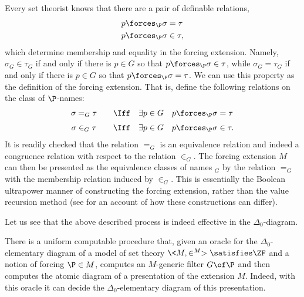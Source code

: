 \documentclass{amsart}
\begin{document}
 Every set theorist knows that there are a pair of definable relations,
 \begin{align*}
 p &\forces_\P \sigma = \tau \\
 p &\forces_\P \sigma \in \tau,
 \end{align*}
 which determine membership and equality in the forcing extension. Namely, $\sigma_G \in \tau_G$ if and only if there is $p \in G$ so that $p \forces_\P \sigma \in \tau$, while $\sigma_G = \tau_G$ if and only if there is $p \in G$ so that $p \forces_\P \sigma = \tau$.
 We can use this property as the definition of the forcing extension. That is, define the following relations on the class of $\P$-names:
   $$\begin{array}{cl}
       \sigma =_G \tau\quad &\Iff \quad \exists p\in G\quad p\forces_\P \sigma=\tau \medskip\\
       \sigma \in_G \tau\quad &\Iff \quad \exists p\in G\quad p\forces_\P \sigma\in\tau.\\
   \end{array}
   $$
 It is readily checked that the relation $=_G$ is an equivalence relation and indeed a congruence relation with respect to the relation $\in_G$. The forcing extension $M$ can then be presented as the equivalence classes of names $_G$ by the relation $=_G$ with the membership relation induced by $\in_G$. This is essentially the Boolean ultrapower manner of constructing the forcing extension, rather than the value recursion method (see \cite{HamkinsSeabold:BooleanUltrapowers} for an account of how these constructions can differ).
 
 Let us see that the above described process is indeed effective in the $\Delta_0$-diagram.
 
 \begin{theorem}\label{Theorem.Computing-atomic-diagram-of-extension}
 There is a uniform computable procedure that, given an oracle for the $\Delta_0$-elementary diagram of a model of set theory $\<M,\in^M> \satisfies \ZF$ and a notion of forcing $\P \in M$, computes an $M$-generic filter $G \of \P$ and then computes the atomic diagram of a presentation of the extension $M$. Indeed, with this oracle it can decide the $\Delta_0$-elementary diagram of this presentation.
 \end{theorem}
 
\end{document}
